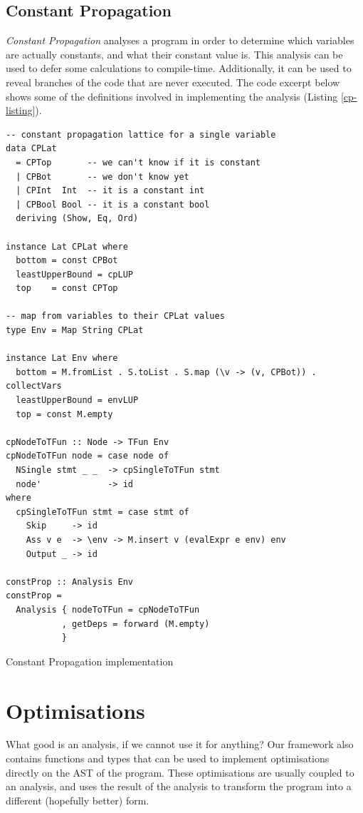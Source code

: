 \documentclass{article}
\begin{document}
\subsection{Constant Propagation}

\emph{Constant Propagation} analyses a program in order to
determine which variables are actually constants, and what their constant
value is. This analysis can be used to defer some calculations to
compile-time. Additionally, it can be used to reveal branches of the
code that are never executed. The code excerpt below shows some of the definitions involved in implementing the analysis (Listing \ref{cp-listing}).

\begin{listing}[H]
\begin{verbatim}
-- constant propagation lattice for a single variable
data CPLat
  = CPTop       -- we can't know if it is constant
  | CPBot       -- we don't know yet
  | CPInt  Int  -- it is a constant int
  | CPBool Bool -- it is a constant bool
  deriving (Show, Eq, Ord)

instance Lat CPLat where
  bottom = const CPBot
  leastUpperBound = cpLUP
  top    = const CPTop

-- map from variables to their CPLat values
type Env = Map String CPLat

instance Lat Env where
  bottom = M.fromList . S.toList . S.map (\v -> (v, CPBot)) . collectVars
  leastUpperBound = envLUP
  top = const M.empty

cpNodeToTFun :: Node -> TFun Env
cpNodeToTFun node = case node of
  NSingle stmt _ _  -> cpSingleToTFun stmt
  node'             -> id
where
  cpSingleToTFun stmt = case stmt of
    Skip     -> id
    Ass v e  -> \env -> M.insert v (evalExpr e env) env
    Output _ -> id

constProp :: Analysis Env
constProp =
  Analysis { nodeToTFun = cpNodeToTFun
           , getDeps = forward (M.empty)
           }
\end{verbatim}
\caption{Constant Propagation implementation}
\label{cp-listing}
\end{listing}

\section{Optimisations}\label{optimizations}

What good is an analysis, if we cannot use it for anything? Our
framework also contains functions and types that can be used to
implement optimisations directly on the AST of the program. These
optimisations are usually coupled to an analysis, and uses the result of
the analysis to transform the program into a different (hopefully
better) form.
\end{document}
